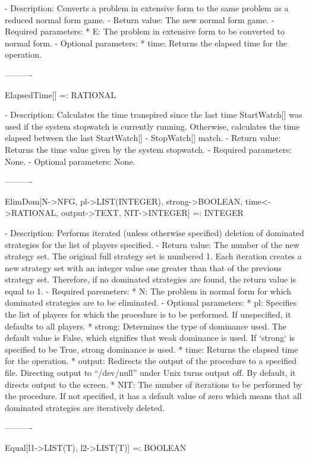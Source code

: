 {   -	Description:  Converts a problem in extensive form to the same problem
	as a reduced normal form game.
   -	Return value:  The new normal form game.  
   -	Required parameters:
	  *  E:  The problem in extensive form to be converted to normal form.
   -	Optional parameters:
	  *  time:  Returns the elapsed time for the operation.

----------

ElapsedTime[] =: RATIONAL

   -	Description:  Calculates the time transpired since the last time
	StartWatch[] was used if the system stopwatch is currently running.
	Otherwise, calculates the time elapsed between the last StartWatch[] -
	StopWatch[] match.
   -	Return value:  Returns the time value given by the system stopwatch.
   -	Required parameters:  None.
   -	Optional parameters:  None.

----------

ElimDom[N->NFG, {pl->LIST(INTEGER)}, {strong->BOOLEAN}, {time<->RATIONAL},
	{output->TEXT}, {NIT->INTEGER}] =: INTEGER

   -	Description:  Performs iterated (unless otherwise specified) deletion 
	of dominated strategies for the list of players specified.  
   -	Return value:  The number of the new strategy set.  The original full
	strategy set is numbered 1.  Each iteration creates a new strategy set
	with an integer value one greater than that of the previous strategy 
	set.  Therefore, if no dominated strategies are found, the return value
	is equal to 1.
   -	Required paremeters:
	  *  N:  The problem in normal form for which dominated strategies are
		to be eliminated.
   -	Optional parameters:
	  *  pl:  Specifies the list of players for which the procedure is to
		be performed.  If unspecified, it defaults to all players. 
 	  *  strong:  Determines the type of dominance used.  The default value
		is False, which signifies that weak dominance is used.  If 
		`strong` is specified to be True, strong dominance is used.  
	  *  time:  Returns the elapsed time for the operation.
	  *  output:  Redirects the output of the procedure to a specified 
		file.  Directing output to ``/dev/null'' under Unix turns 
		output off.  By default, it directs output to the screen.
	  *  NIT:  The number of iterations to be performed by the procedure.
		If not specified, it has a default value of zero which means 
		that all dominated strategies are iteratively deleted.

----------

Equal[l1->LIST(T), l2->LIST(T)] =: BOOLEAN

}
